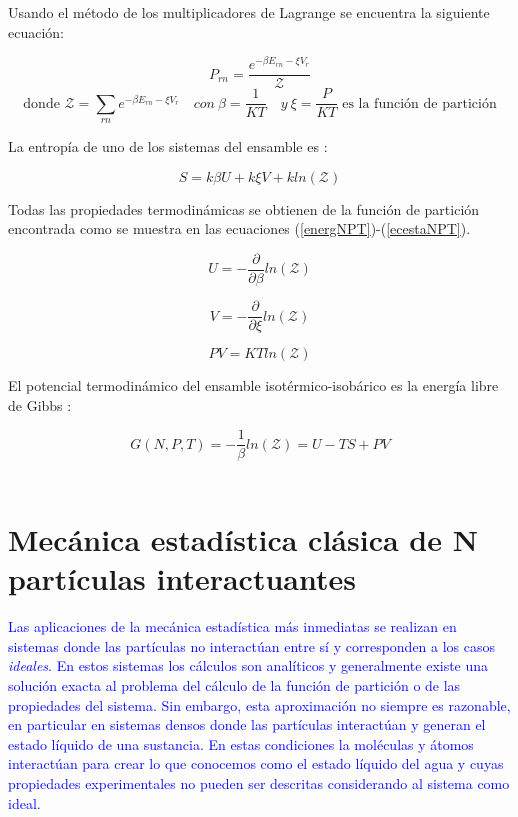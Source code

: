 Usando el método de los multiplicadores de Lagrange se encuentra la siguiente ecuación:

\begin{equation} \label{probNPT}
    P_{rn} = \frac{e^{-\beta E_{rn}-\xi V_r}}{\mathcal{Z}}
\end{equation}
\begin{equation*} \label{funcpartNPT}
    \text{donde }\mathcal{Z} = \sum_{rn} e^{-\beta E_{rn}-\xi V_r} \quad con\ \beta=\frac{1}{KT} \quad y\ \xi=\frac{P}{KT}\text{ es la función de partición}
\end{equation*}

La entropía de uno de los sistemas del ensamble es \cite{mcquarrie1976}:

\begin{equation} \label{entrpnpt}
    S = k\beta U + k\xi V + kln(\mathcal{Z})
\end{equation}

Todas las propiedades termodinámicas se obtienen de la función de partición encontrada como se muestra en las ecuaciones (\ref{energNPT})-(\ref{ecestaNPT}).

\begin{equation} \label{energNPT}
    U=-\frac{\partial}{\partial \beta}ln(\mathcal{Z})
\end{equation}

\begin{equation} \label{volNPT}
    V=-\frac{\partial}{\partial \xi}ln(\mathcal{Z})
\end{equation}

\begin{equation} \label{ecestaNPT}
    PV=KTln(\mathcal{Z})
\end{equation}

El potencial termodinámico del ensamble isotérmico-isobárico es la energía libre de Gibbs \cite{mcquarrie1976}:

\begin{equation} \label{potgibbs}
    G(N,P,T)=-\frac{1}{\beta}ln(\mathcal{Z})=U-TS+PV
\end{equation}\\

\section{Mecánica estadística clásica de N partículas interactuantes} \label{MecClasNpart}

\textcolor{blue}{
Las aplicaciones de la mecánica estadística más inmediatas se realizan en sistemas donde las partículas no interactúan entre sí y corresponden a los casos \textit{ideales}. En estos sistemas los cálculos son analíticos y generalmente existe una solución exacta al problema del cálculo de la función de partición o de las propiedades del sistema. Sin embargo, esta aproximación no siempre es razonable, en particular en sistemas densos donde las partículas interactúan y generan el estado líquido de una sustancia. En estas condiciones la moléculas y átomos interactúan para crear lo que conocemos como el estado líquido del agua y cuyas propiedades experimentales no pueden ser descritas considerando al sistema como ideal.}\\

